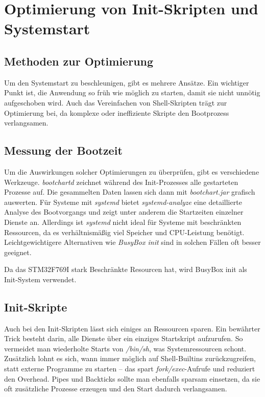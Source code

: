
\section{Optimierung von Init-Skripten und Systemstart}

\subsection{Methoden zur Optimierung}
Um den Systemstart zu beschleunigen, gibt es mehrere Ansätze. Ein wichtiger Punkt ist, die Anwendung so früh
wie möglich zu starten, damit sie nicht unnötig aufgeschoben wird. Auch das Vereinfachen von Shell-Skripten
trägt zur Optimierung bei, da komplexe oder ineffiziente Skripte den Bootprozess verlangsamen.

\subsection{Messung der Bootzeit}
Um die Auswirkungen solcher Optimierungen zu überprüfen, gibt es verschiedene Werkzeuge. \textit{bootchartd}
zeichnet während des Init-Prozesses alle gestarteten Prozesse auf. Die gesammelten Daten lassen sich dann mit
\textit{bootchart.jar} grafisch auswerten. Für Systeme mit \textit{systemd} bietet \textit{systemd-analyze}
eine detaillierte Analyse des Bootvorgangs und zeigt unter anderem die Startzeiten einzelner Dienste an.
Allerdings ist \textit{systemd} nicht ideal für Systeme mit beschränkten Ressourcen, da es verhältnismäßig
viel Speicher und CPU-Leistung benötigt. Leichtgewichtigere Alternativen wie \textit{BusyBox init} sind in
solchen Fällen oft besser geeignet.

Da das STM32F769I stark Beschränkte Resourcen hat, wird BusyBox init als Init-System verwendet.

\subsection{Init-Skripte}
Auch bei den Init-Skripten lässt sich einiges an Ressourcen sparen. Ein bewährter Trick besteht darin, alle
Dienste über ein einziges Startskript aufzurufen. So vermeidet man wiederholte Starts von \textit{/bin/sh},
was Systemressourcen schont. Zusätzlich lohnt es sich, wann immer möglich auf Shell-Builtins zurückzugreifen,
statt externe Programme zu starten – das spart \textit{fork/exec}-Aufrufe und reduziert den Overhead. Pipes
und Backticks sollte man ebenfalls sparsam einsetzen, da sie oft zusätzliche Prozesse erzeugen und den Start
dadurch verlangsamen.

